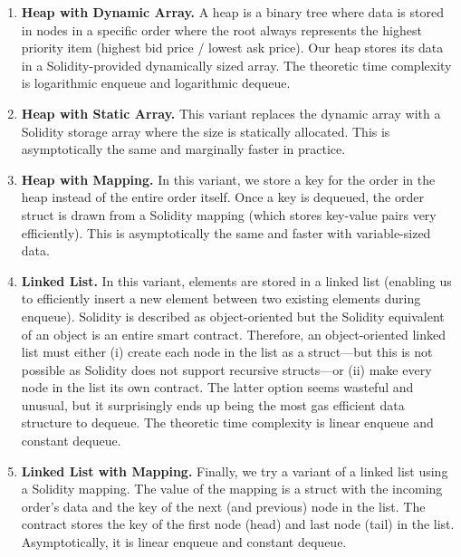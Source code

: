 \begin{enumerate}

\item \textbf{Heap with Dynamic Array.} A heap is a binary tree where data is stored in nodes in a specific order where the root always represents the highest priority item (\ie highest bid price / lowest ask price). Our heap stores its data in a Solidity-provided dynamically sized array. The theoretic time complexity is logarithmic enqueue and logarithmic dequeue.

\item \textbf{Heap with Static Array.} This variant replaces the dynamic array with a Solidity storage array where the size is statically allocated. This is asymptotically the same and marginally faster in practice.  %

\item \textbf{Heap with Mapping.} In this variant, we store a key for the order in the heap instead of the entire order itself. Once a key is dequeued, the order struct is drawn from a Solidity mapping (which stores key-value pairs very efficiently). This is asymptotically the same and faster with variable-sized data. 

\item \textbf{Linked List.} In this variant, elements are stored in a linked list (enabling us to efficiently insert a new element between two existing elements during enqueue). Solidity is described as object-oriented but the Solidity equivalent of an object is an entire smart contract. Therefore, an object-oriented linked list must either (i) create each node in the list as a struct---but this is not possible as Solidity does not support recursive structs---or (ii) make every node in the list its own contract. The latter option seems wasteful and unusual, but it surprisingly ends up being the most gas efficient data structure to dequeue. The theoretic time complexity is linear enqueue and constant dequeue.

\item \textbf{Linked List with Mapping.} Finally, we try a variant of a linked list using a Solidity mapping. The value of the mapping is a struct with the incoming order's data and the key of the next (and previous) node in the list. The contract stores the key of the first node (head) and last node (tail) in the list. Asymptotically, it is linear enqueue and constant dequeue. 

\end{enumerate}

